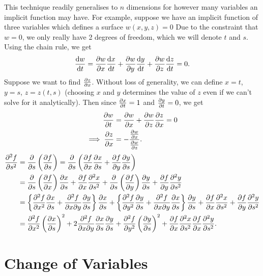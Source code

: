 \documentclass[../multivariate_calculus.tex]{subfiles}
\begin{document}
        This technique readily generalises to $n$ dimensions for however many variables an implicit function may have.
        For example, suppose we have an implicit function of three variables which defines a surface $w(x,y,z)=0$
        Due to the constraint that $w=0$, we only really have 2 degrees of freedom, which we will denote $t$ and $s$.
        Using the chain rule, we get
        \begin{equation}
            \dv{w}{t}=\pdv{w}{x}\dv{x}{t}+\pdv{w}{y}\dv{y}{t}+\pdv{w}{z}\dv{z}{t}=0.
        \end{equation}
        Suppose we want to find $\pdv{z}{x}$.
        Without loss of generality, we can define $x=t$, $y=s$, $z=z(t,s)$ (choosing $x$ and $y$ determines the value of $z$ even if we can't solve for it analytically).
        Then since $\pdv{x}{t}=1$ and $\pdv{y}{t}=0$, we get
        \begin{align}
            \pdv{w}{t}&=\pdv{w}{x}+\pdv{w}{z}\pdv{z}{x}=0\\
            \implies\pdv{z}{x}&=-\frac{\pdv{w}{x}}{\pdv{w}{z}}.
        \end{align}
        \begin{align}
            \pdv[2]{f}{s}&=\pdv{}{s}\left(\pdv{f}{s}\right)=\pdv{}{s}\left(\pdv{f}{x}\pdv{x}{s}+\pdv{f}{y}\pdv{y}{s}\right)\\
            &=\pdv{}{s}\left(\pdv{f}{x}\right)\pdv{x}{s}+\pdv{f}{x}\pdv[2]{x}{s}+\pdv{}{s}\left(\pdv{f}{y}\right)\pdv{y}{s}+\pdv{f}{y}\pdv[2]{y}{s}\\
            &=\left\{\pdv[2]{f}{x}\pdv{x}{s}+\frac{\partial^2 f}{\partial x\partial y}\pdv{y}{s}\right\}\pdv{x}{s}+\left\{\pdv[2]{f}{y}\pdv{y}{s}+\frac{\partial^2 f}{\partial x\partial y}\pdv{x}{s}\right\}\pdv{y}{s}+\pdv{f}{x}\pdv[2]{x}{s}+\pdv{f}{y}\pdv[2]{y}{s}\\
            &=\pdv[2]{f}{x}\left(\pdv{x}{s}\right)^2+2\frac{\partial^2 f}{\partial x\partial y}\pdv{x}{s}\pdv{y}{s}+\pdv[2]{f}{y}\left(\pdv{y}{s}\right)^2+\pdv{f}{x}\pdv[2]{x}{s}\pdv{f}{x}\pdv[2]{y}{s}.
        \end{align}

    \section{Change of Variables}
\end{document}
